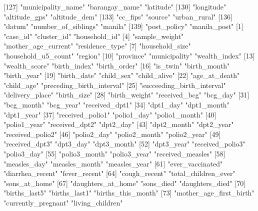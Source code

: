 [127] "municipality_name"         "barangay_name"             "latitude"                 
[130] "longitude"                 "altitude_gps"              "altitude_dem"             
[133] "cc_fips"                   "source"                    "urban_rural"              
[136] "datum"                     "number_of_siblings"        "manila"                   
[139] "post_policy"               "manila_post"              
  [1] "case_id"                   "cluster_id"                "household_id"             
  [4] "sample_weight"             "mother_age_current"        "residence_type"           
  [7] "household_size"            "household_u5_count"        "region"                   
 [10] "province"                  "municipality"              "wealth_index"             
 [13] "wealth_score"              "birth_index"               "birth_order"              
 [16] "is_twin"                   "birth_month"               "birth_year"               
 [19] "birth_date"                "child_sex"                 "child_alive"              
 [22] "age_at_death"              "child_age"                 "preceding_birth_interval" 
 [25] "succeeding_birth_interval" "delivery_place"            "birth_size"               
 [28] "birth_weight"              "received_bcg"              "bcg_day"                  
 [31] "bcg_month"                 "bcg_year"                  "received_dpt1"            
 [34] "dpt1_day"                  "dpt1_month"                "dpt1_year"                
 [37] "received_polio1"           "polio1_day"                "polio1_month"             
 [40] "polio1_year"               "received_dpt2"             "dpt2_day"                 
 [43] "dpt2_month"                "dpt2_year"                 "received_polio2"          
 [46] "polio2_day"                "polio2_month"              "polio2_year"              
 [49] "received_dpt3"             "dpt3_day"                  "dpt3_month"               
 [52] "dpt3_year"                 "received_polio3"           "polio3_day"               
 [55] "polio3_month"              "polio3_year"               "received_measles"         
 [58] "measles_day"               "measles_month"             "measles_year"             
 [61] "ever_vaccinated"           "diarrhea_recent"           "fever_recent"             
 [64] "cough_recent"              "total_children_ever"       "sons_at_home"             
 [67] "daughters_at_home"         "sons_died"                 "daughters_died"           
 [70] "births_last5"              "births_last1"              "births_this_month"        
 [73] "mother_age_first_birth"    "currently_pregnant"        "living_children"          
